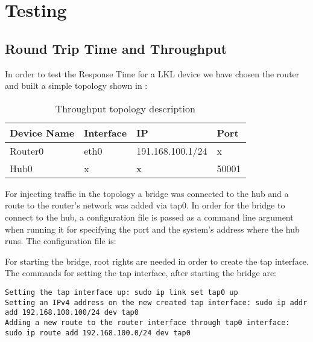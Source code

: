 \chapter{Testing}
\label{ch-testing}

\section{Round Trip Time and Throughput}
\label{sec:rt-troughput}

In order to test the Response Time for a LKL device we have chosen the router and built a simple topology shown in :
\begin{center}
  \begin{table}[htb]
  \begin{center}
  \begin{tabular}{| l | l | l | l |}
    \hline
      Device Name & Interface & IP & Port \\ \hline
      Router0 & eth0 & 191.168.100.1/24 & x \\ \hline
      Hub0 & x & x & 50001\\ 
    \hline
  \end{tabular}
  \end{center}
  \caption{Throughput topology description}
  \label{table:resp-time}
  \end{table}
\end{center}


For injecting traffic in the topology a bridge was connected to the hub and a route to the router's network 
was added via tap0. In order for the bridge to connect to the hub, a configuration file is passed as a command 
line argument when running it for specifying the port and the system's address where the hub runs.
The  configuration file is: 
\lstset{language=TeX, caption=Bridge configuration file}

For starting the bridge, root rights are needed in order to create the tap interface.
The commands for setting the tap interface, after starting the bridge are:
\lstset{language=TeX,caption=Commands for configuring the tap interface,label=test-bridge-config}
\begin{lstlisting}
Setting the tap interface up: sudo ip link set tap0 up
Setting an IPv4 address on the new created tap interface: sudo ip addr add 192.168.100.100/24 dev tap0
Adding a new route to the router interface through tap0 interface: sudo ip route add 192.168.100.0/24 dev tap0
\end{lstlisting}

